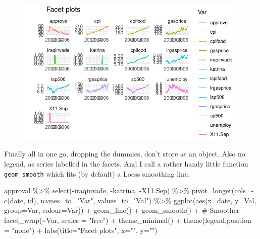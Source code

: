 \documentclass[
  letterpaper,
]{book}
\newenvironment{Shaded}{\begin{snugshade}}{\end{snugshade}}
\newcommand{\AttributeTok}[1]{\textcolor[rgb]{0.40,0.45,0.13}{#1}}
\newcommand{\CommentTok}[1]{\textcolor[rgb]{0.37,0.37,0.37}{#1}}
\newcommand{\FunctionTok}[1]{\textcolor[rgb]{0.28,0.35,0.67}{#1}}
\newcommand{\NormalTok}[1]{\textcolor[rgb]{0.00,0.23,0.31}{#1}}
\newcommand{\SpecialCharTok}[1]{\textcolor[rgb]{0.37,0.37,0.37}{#1}}
\newcommand{\StringTok}[1]{\textcolor[rgb]{0.13,0.47,0.30}{#1}}
\begin{document}
\begin{figure}[H]

{\centering \includegraphics{Appendix1_files/figure-pdf/unnamed-chunk-11-1.pdf}

}

\end{figure}

Finally all in one go, dropping the dummies, don't store as an object.
Also no legend, as series labelled in the facets. And I call a rather
handy little function \texttt{geom\_smooth} which fits (by default) a
Loess smoothing line.

\begin{Shaded}
\begin{Highlighting}[]
\NormalTok{approval }\SpecialCharTok{\%\textgreater{}\%} 
  \FunctionTok{select}\NormalTok{(}\SpecialCharTok{{-}}\NormalTok{iraqinvade, }\SpecialCharTok{{-}}\NormalTok{katrina, }\SpecialCharTok{{-}}\NormalTok{X11.Sep) }\SpecialCharTok{\%\textgreater{}\%}
  \FunctionTok{pivot\_longer}\NormalTok{(}\AttributeTok{cols=}\SpecialCharTok{{-}}\FunctionTok{c}\NormalTok{(date, id), }\AttributeTok{names\_to=}\StringTok{"Var"}\NormalTok{, }\AttributeTok{values\_to=}\StringTok{"Val"}\NormalTok{) }\SpecialCharTok{\%\textgreater{}\%}
  \FunctionTok{ggplot}\NormalTok{(}\FunctionTok{aes}\NormalTok{(}\AttributeTok{x=}\NormalTok{date, }\AttributeTok{y=}\NormalTok{Val, }\AttributeTok{group=}\NormalTok{Var, }\AttributeTok{colour=}\NormalTok{Var)) }\SpecialCharTok{+}
  \FunctionTok{geom\_line}\NormalTok{() }\SpecialCharTok{+}
  \FunctionTok{geom\_smooth}\NormalTok{() }\SpecialCharTok{+} \CommentTok{\# Smoother}
  \FunctionTok{facet\_wrap}\NormalTok{(}\SpecialCharTok{\textasciitilde{}}\NormalTok{Var, }\AttributeTok{scales =} \StringTok{"free"}\NormalTok{) }\SpecialCharTok{+}
  \FunctionTok{theme\_minimal}\NormalTok{() }\SpecialCharTok{+} 
  \FunctionTok{theme}\NormalTok{(}\AttributeTok{legend.position =} \StringTok{"none"}\NormalTok{) }\SpecialCharTok{+}
  \FunctionTok{labs}\NormalTok{(}\AttributeTok{title=}\StringTok{"Facet plots"}\NormalTok{, }\AttributeTok{x=}\StringTok{""}\NormalTok{, }\AttributeTok{y=}\StringTok{""}\NormalTok{)}
\end{Highlighting}
\end{Shaded}
\end{document}
